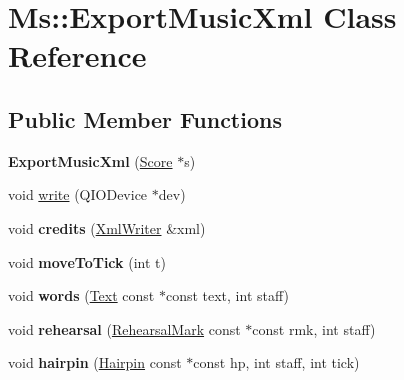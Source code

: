 \hypertarget{class_ms_1_1_export_music_xml}{}\section{Ms\+:\+:Export\+Music\+Xml Class Reference}
\label{class_ms_1_1_export_music_xml}
\subsection*{Public Member Functions}
\begin{DoxyCompactItemize}
\item 
\mbox{\label{class_ms_1_1_export_music_xml_a7c6e0711107261a5d4b031a596f2f45a}} 
{\bfseries Export\+Music\+Xml} (\hyperlink{class_ms_1_1_score}{Score} $\ast$s)
\item 
void \hyperlink{class_ms_1_1_export_music_xml_a7acf6ba93e814908c050a9d26bb2ad8b}{write} (Q\+I\+O\+Device $\ast$dev)
\item 
\mbox{\label{class_ms_1_1_export_music_xml_ac7f70649c0b6978fdf3bea35f8f38005}} 
void {\bfseries credits} (\hyperlink{class_ms_1_1_xml_writer}{Xml\+Writer} \&xml)
\item 
\mbox{\label{class_ms_1_1_export_music_xml_af889a2c6e0f560094a1202ccd4256bf2}} 
void {\bfseries move\+To\+Tick} (int t)
\item 
\mbox{\label{class_ms_1_1_export_music_xml_a504b0b0f0dd29399b7e1a71d695dbc75}} 
void {\bfseries words} (\hyperlink{class_ms_1_1_text}{Text} const $\ast$const text, int staff)
\item 
\mbox{\label{class_ms_1_1_export_music_xml_a2bdc0aba34d8c0539baa328f3f624f44}} 
void {\bfseries rehearsal} (\hyperlink{class_ms_1_1_rehearsal_mark}{Rehearsal\+Mark} const $\ast$const rmk, int staff)
\item 
\mbox{\label{class_ms_1_1_export_music_xml_aa2dee352a74ca9288c782f008e60604a}} 
void {\bfseries hairpin} (\hyperlink{class_ms_1_1_hairpin}{Hairpin} const $\ast$const hp, int staff, int tick)
\item 
\mbox{\label{class_ms_1_1_export_music_xml_a937dae3a58954254a912578fbb092169}} 

\end{DoxyCompactItemize}
